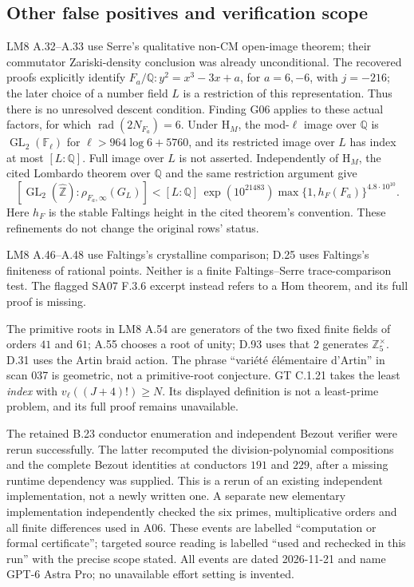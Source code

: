 \documentclass[11pt,a4paper]{article}
\begin{document}
\subsection{Other false positives and verification scope}

LM8 A.32--A.33 use Serre's qualitative non-CM open-image theorem;
their commutator Zariski-density conclusion was already unconditional.
The recovered proofs explicitly identify
$F_a/\mathbb Q:y^2=x^3-3x+a$, for $a=6,-6$, with $j=-216$;
the later choice of a number field $L$ is a restriction of this
representation. Thus there is no unresolved descent condition.
Finding G06 applies to these actual factors, for which
$\operatorname{rad}(2N_{F_a})=6$. Under $\mathrm H_M$, the mod-$\ell$
image over $\mathbb Q$ is $\operatorname{GL}_2(\mathbb F_\ell)$ for
$\ell>964\log6+5760$, and its restricted image over $L$ has index
at most $[L:\mathbb Q]$. Full image over $L$ is not asserted.
Independently of $\mathrm H_M$, the cited Lombardo theorem over
$\mathbb Q$ and the same restriction argument give
\[
 [\operatorname{GL}_2(\widehat{\mathbb Z}):\rho_{F_a,\infty}(G_L)]
 <[L:\mathbb Q]\,\exp(10^{21483})
       \max\{1,h_F(F_a)\}^{4.8\cdot10^{10}}.
\]
Here $h_F$ is the stable Faltings height in the cited theorem's
convention. These refinements do not change the original rows' status.

LM8 A.46--A.48 use Faltings's crystalline comparison; D.25 uses
Faltings's finiteness of rational points. Neither is a finite
Faltings--Serre trace-comparison test. The flagged SA07 F.3.6 excerpt
instead refers to a Hom theorem, and its full proof is missing.

The primitive roots in LM8 A.54 are generators of the two fixed
finite fields of orders $41$ and $61$; A.55 chooses a root of unity;
D.93 uses that $2$ generates $\mathbb Z_5^\times$. D.31 uses the
Artin braid action. The phrase ``vari\'et\'e \'el\'ementaire d'Artin''
in scan 037 is geometric, not a primitive-root conjecture.
GT C.1.21 takes the least \emph{index} with
$v_\ell((J+4)!)\ge N$. Its displayed definition is not a least-prime
problem, and its full proof remains unavailable.

The retained B.23 conductor enumeration and independent Bezout verifier
were rerun successfully. The latter recomputed the division-polynomial
compositions and the complete Bezout identities at conductors $191$
and $229$, after a missing runtime dependency was supplied. This is a
rerun of an existing independent implementation, not a newly written
one. A separate new elementary implementation independently checked
the six primes, multiplicative orders and all finite differences used
in A06. These events are labelled ``computation or formal certificate'';
targeted source reading is labelled ``used and rechecked in this run''
with the precise scope stated. All events are dated 2026-11-21 and name
GPT-6 Astra Pro; no unavailable effort setting is invented.
\end{document}

